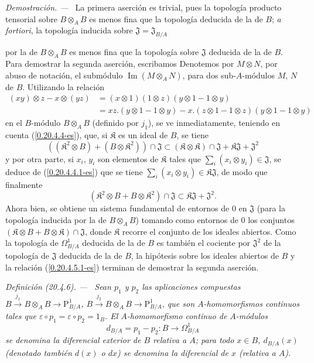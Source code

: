\documentclass[10pt,oneside]{book}
\makeatletter
\newcommand{\sref}[1]{\textup{(\ref{#1})}}
\newcommand{\setmanualcurrentlabel}[1]{\def\@currentlabel{#1}}
\newcommand{\oldpage}[2][]{%
  \setcounter{footnote}{0}%
  \marginpar{\scriptsize\textbf{#1}~|~#2}\ignorespaces}
\newenvironment{definition}[1][]{%
  \setmanualcurrentlabel{#1}\par\medskip\noindent\itshape Definición (#1). ---\ }{\par}
\newenvironment{proof}{%
  \par\medskip\noindent\textit{Demostración. ---\ }}{\par}
\providecommand{\setmin}{-}%
\makeatother
\begin{document}
\begin{proof}
La primera aserción es trivial, pues la topología producto tensorial sobre
$B\otimes_A B$ es menos fina que la topología deducida de la de $B$;
\emph{a fortiori}, la topología inducida sobre
$\mathfrak{J}=\mathfrak{J}_{B/A}$

\oldpage[0\textsubscript{IV-1}]{125}
por la de $B\otimes_A B$ es menos fina que la topología sobre $\mathfrak{J}$
deducida de la de $B$. Para demostrar la segunda aserción, escribamos
Denotemos por $M\otimes N$, por abuso de notación, el submódulo
$\operatorname{Im}(M\otimes_A N)$, para dos sub-$A$-módulos $M$, $N$ de $B$.
Utilizando la relación
\[
\begin{aligned}
  (xy)\otimes z\setmin x\otimes(yz)
  &=(x\otimes1)(1\otimes z)(y\otimes1\setmin 1\otimes y)\\
  &=xz.(y\otimes1\setmin 1\otimes y)
    -x.(z\otimes1\setmin 1\otimes z)(y\otimes1\setmin 1\otimes y)
\end{aligned}
\]
en el $B$-módulo $B\otimes_A B$ (definido por $j_1$), se ve inmediatamente,
teniendo en cuenta \sref{0.20.4.4-es}, que, si $\mathfrak K$ es un ideal de
$B$, se tiene
\[
  ((\mathfrak K^2\otimes B)+(B\otimes\mathfrak K^2))\cap\mathfrak{J}
  \subset(\mathfrak K\otimes\mathfrak K)\cap\mathfrak{J}
  +\mathfrak K\mathfrak{J}+\mathfrak{J}^2
\]
y por otra parte, si $x_i$, $y_i$ son elementos de $\mathfrak K$ tales
que $\sum_i(x_i\otimes y_i)\in\mathfrak{J}$, se deduce de
\sref{0.20.4.4.1-es} que se tiene
$\sum_i(x_i\otimes y_i)\in\mathfrak K\mathfrak{J}$, de modo que finalmente
\begin{equation}
\tag{20.4.5.1}
\label{0.20.4.5.1-es}
  (\mathfrak K^2\otimes B+B\otimes\mathfrak K^2)\cap\mathfrak{J}
  \subset\mathfrak K\mathfrak{J}+\mathfrak{J}^2.
\end{equation}
Ahora bien, se obtiene un sistema fundamental de entornos de $0$ en $\mathfrak{J}$
(para la topología inducida por la de $B\otimes_A B$) tomando como
entornos de $0$ los conjuntos
$(\mathfrak K\otimes B+B\otimes\mathfrak K)\cap\mathfrak{J}$, donde
$\mathfrak K$ recorre el conjunto de los ideales abiertos. Como la topología de
$\Omega^1_{B/A}$ deducida de la de $B$ es también el cociente por
$\mathfrak{J}^2$ de la topología de $\mathfrak{J}$ deducida de la de $B$,
la hipótesis sobre los ideales abiertos de $B$ y la relación
\sref{0.20.4.5.1-es} terminan de demostrar la segunda aserción.
\end{proof}

\begin{definition}[20.4.6]
\label{0.20.4.6-es}
Sean $p_1$ y $p_2$ las aplicaciones compuestas
$B\xrightarrow{j_1}B\otimes_A B\to\mathrm{P}^1_{B/A}$,
$B\xrightarrow{j_2}B\otimes_A B\to\mathrm{P}^1_{B/A}$, que son
$A$-homomorfismos continuos tales que
$\varepsilon\circ p_1=\varepsilon\circ p_2=1_B$. El
$A$-homomorfismo continuo de $A$-módulos
\begin{equation}
\tag{20.4.6.1}
\label{0.20.4.6.1-es}
  d_{B/A}=p_1\setmin p_2:B\to\Omega^1_{B/A}
\end{equation}
se denomina la diferencial exterior de $B$ relativa a $A$; para
todo $x\in B$, $d_{B/A}(x)$ (denotado también $d(x)$ o $dx$) se denomina la
diferencial de $x$ (relativa a $A$).
\end{definition}
\end{document}
